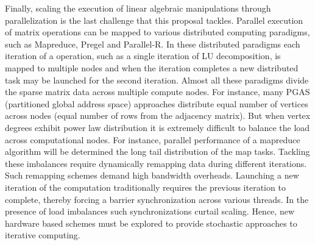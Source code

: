 
Finally, scaling the execution of linear algebraic manipulations through parallelization is the last challenge that this proposal tackles. 
Parallel execution of matrix operations can be mapped to various distributed computing paradigms, such as Mapreduce, Pregel and Parallel-R. 
In these distributed paradigms each iteration of a operation, such as a single iteration of LU decomposition, is mapped to multiple nodes and when the iteration completes a new distributed task may be launched for the second iteration.   
Almost all these paradigms divide the sparse matrix data across multiple compute nodes. 
For instance, many PGAS (partitioned global address space) approaches distribute equal number of vertices across nodes (equal number of rows from the adjacency matrix). 
But when vertex degrees exhibit power law distribution it  is extremely difficult to balance the load across computational nodes. 
For instance, parallel performance of a mapreduce algorithm will be determined the long tail distribution of the map tasks.  
Tackling these imbalances require dynamically remapping data during different iterations. 
Such remapping schemes demand high bandwidth overheads. 
Launching a  new iteration of the computation traditionally requires the previous iteration to complete, thereby forcing a barrier synchronization across various threads. 
In the presence of load imbalances such synchronizations curtail scaling. 
Hence, new hardware based schemes must be explored to provide stochastic approaches to iterative computing.    

 

